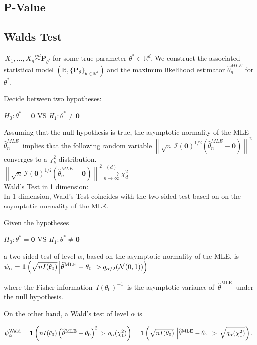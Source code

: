 \subsection*{P-Value}

\subsection*{Walds Test}

$\, X_1, \ldots , X_ n \stackrel{iid}{\sim } \mathbf{P}_{\theta ^*}$  for some true parameter $\theta ^* \in \mathbb {R}^ d$. We construct the associated statistical model $(\mathbb {R}, \{  \mathbf{P}_\theta \} _{\theta \in \mathbb {R}^ d } )$ and the maximum likelihood estimator $\widehat{\theta }_ n^{MLE}$ for $\theta ^*$.

Decide between two hypotheses:

$H_0: \displaystyle  \theta ^* = \mathbf{0}$ VS $H_1: \displaystyle  \theta ^* \neq \mathbf{0}$

Assuming that the null hypothesis is true, the asymptotic normality of the MLE $\widehat{\theta }_ n^{MLE}\,$ implies that the following random variable $\left\lVert \sqrt{n}\, \mathcal{I}(\mathbf{0})^{1/2}(\widehat{\theta }_ n^{MLE}- \mathbf{0}) \right\rVert ^2$ converges to a $\chi ^2_ k$ distribution.\\

$\left\lVert \sqrt{n}\, \mathcal{I}(\mathbf{0})^{1/2}(\widehat{\theta }_ n^{MLE}- \mathbf{0}) \right\rVert ^2 \xrightarrow [n\to \infty ]{(d)} \chi ^2_ d\,$\\

Wald's Test in 1 dimension:\\

In 1 dimension, Wald's Test coincides with the two-sided test based on on the asymptotic normality of the MLE.

Given the hypotheses

$H_0: \displaystyle  \theta ^* = \mathbf{0}$ VS $H_1: \displaystyle  \theta ^* \neq \mathbf{0}$	 	 
 	 		 	 
a two-sided test of level $\alpha$, based on the asymptotic normality of the MLE, is $\displaystyle  \displaystyle \psi _\alpha =\mathbf{1}\left(\sqrt{nI(\theta _0)} \left| \widehat{\theta }^{\text {MLE}} -\theta _0 \right|>q_{\alpha /2}(\mathcal{N}(0,1))\right)$

 		 	 
where the Fisher information $\, I(\theta _0)^{-1}\,$ is the asymptotic variance of $\, \widehat{\theta }^{\text {MLE}}\,$ under the null hypothesis.

On the other hand, a Wald's test of level $\alpha$ is

$\displaystyle  \displaystyle \psi ^{\text {Wald}}_\alpha	= \displaystyle \mathbf{1}\left(nI(\theta _0) \left(\widehat{\theta }^{\text {MLE}} -\theta _0\right)^2\, >\, q_{\alpha }(\chi ^2_1)\right) = \displaystyle \mathbf{1}\left(\sqrt{nI(\theta _0)} \, \left| \widehat{\theta }^{\text {MLE}} -\theta _0 \right|\, >\, \sqrt{q_{\alpha }(\chi ^2_1)}\right).$			 	 
 	 			 